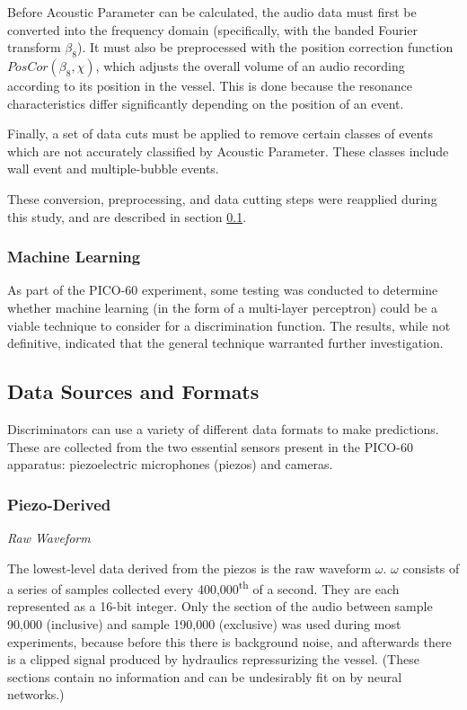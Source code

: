 \documentclass[10pt]{article}
\begin{document}
Before Acoustic Parameter can be calculated, the audio data must first be converted into the frequency domain (specifically, with the banded Fourier transform $\beta_{8}$). It must also be preprocessed with the position correction function $PosCor(\beta_{8}, \chi)$, which adjusts the overall volume of an audio recording according to its position in the vessel. This is done because the resonance characteristics differ significantly depending on the position of an event.

Finally, a set of data cuts must be applied to remove certain classes of events which are not accurately classified by Acoustic Parameter. These classes include wall event and multiple-bubble events.

These conversion, preprocessing, and data cutting steps were reapplied during this study, and are described in section \ref{data_formats}.

\subsubsection{Machine Learning}

As part of the PICO-60 experiment, some testing was conducted to determine whether machine learning (in the form of a multi-layer perceptron) could be a viable technique to consider for a discrimination function. The results, while not definitive, indicated that the general technique warranted further investigation.

\subsection{Data Sources and Formats} \label{data_formats}

Discriminators can use a variety of different data formats to make predictions. These are collected from the two essential sensors present in the PICO-60 apparatus: piezoelectric microphones (piezos) and cameras.

\subsubsection{Piezo-Derived}

\textit{Raw Waveform}

The lowest-level data derived from the piezos is the raw waveform $\omega$. $\omega$ consists of a series of samples collected every 400,000\textsuperscript{th} of a second. They are each represented as a 16-bit integer. Only the section of the audio between sample 90,000 (inclusive) and sample 190,000 (exclusive) was used during most experiments, because before this there is background noise, and afterwards there is a clipped signal produced by hydraulics repressurizing the vessel. (These sections contain no information and can be undesirably fit on by neural networks.)
\end{document}
